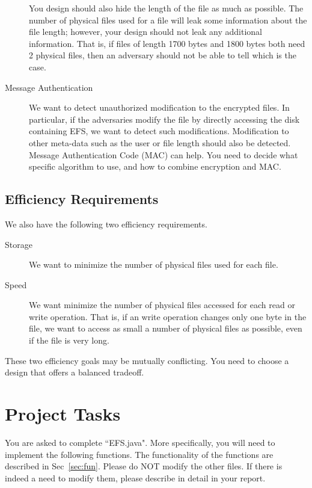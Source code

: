 \documentclass[11pt]{article}
\begin{document}
\begin{description}
You design should also hide the length of the file as much as possible.  The number of physical files used for a file will leak some information about the file length; however, your design should not leak any additional information.  That is, if files of length 1700 bytes and 1800 bytes both need 2 physical files, then an adversary should not be able to tell which is the case.



 \item[Message Authentication]
We want to detect unauthorized modification to the encrypted files.  In particular, if the adversaries modify the file by directly accessing the disk containing EFS, we want to detect such modifications.  Modification to other meta-data such as the user or file length should also be detected.  Message Authentication Code (MAC) can help.  You need to decide what specific algorithm to use, and how to combine encryption and MAC.


\end{description}


\subsection{Efficiency Requirements}

We also have the following two efficiency requirements.
\begin{description}
 \item[Storage]
We want to minimize the number of physical files used for each file.

 \item[Speed]
We want minimize the number of physical files accessed for each read or write operation.  That is, if an write operation changes only one byte in the file, we want to access as small a number of physical files as possible, even if the file is very long.
\end{description}
These two efficiency goals may be mutually conflicting.  You need to choose a design that offers a balanced tradeoff.


\section{Project Tasks}

You are asked to complete ``EFS.java". More specifically, you will need to implement the following functions. The functionality of the functions are described in Sec~\ref{sec:fun}. Please do NOT modify the other files. If there is indeed a need to modify them, please describe in detail in your report.
\end{document}
